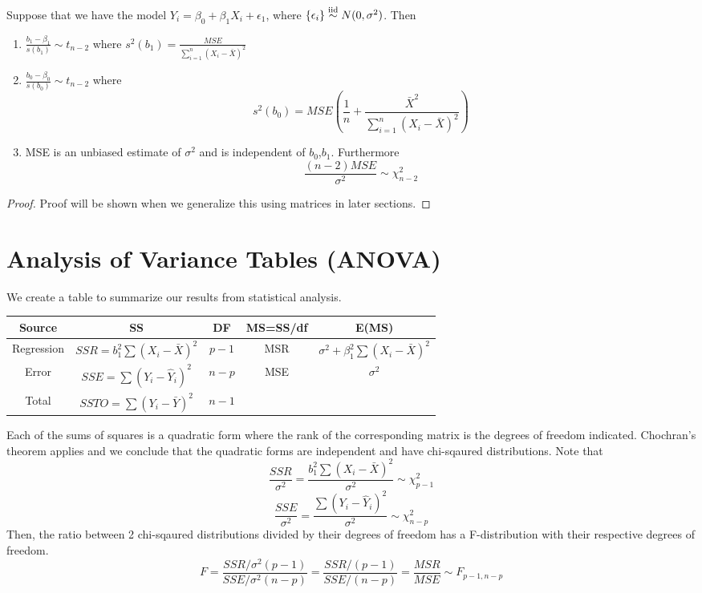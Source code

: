 Suppose that we have the model $Y_i = \beta_0 + \beta_1X_i + \epsilon_1$, where $\{\epsilon_i\} \overset{\mathrm{iid}}{\sim} N(0,\sigma^2)$. Then 
\begin{enumerate}[label=(\alph*)]
    \item $\frac{b_1 - \beta_1}{s(b_1)} \sim t_{n-2}$ where $s^2(b_1) = \frac{MSE}{\sum_{i=1}^n (X_i - \bar{X})^2}$
    \item $\frac{b_0 - \beta_0}{s(b_0)} \sim t_{n-2}$ where 
    \[s^2(b_0) = MSE\left(\frac{1}{n} + \frac{\bar{X}^2}{\sum_{i=1}^n (X_i-\bar{X})^2}\right)\]
    \item MSE is an unbiased estimate of $\sigma^2$ and is independent of $b_0$,$b_1$. Furthermore
    \[\frac{(n-2)MSE}{\sigma^2} \sim \chi_{n-2}^2\]
\end{enumerate}
\begin{proof}
    Proof will be shown when we generalize this using matrices in later sections.
\end{proof}

\section{Analysis of Variance Tables (ANOVA)}

We create a table to summarize our results from statistical analysis. 

\begin{center}
    \begin{tabular}{|c|c|c|c|c|}
        \hline
        Source & SS & DF & MS=SS/df & E(MS)\\
        \hline
        \hline
        Regression & $SSR = b_1^2\sum(X_i-\bar{X})^2$ & $p-1$ & MSR & $\sigma^2 + \beta_1^2\sum(X_i - \bar{X})^2$\\
        \hline
        Error & $SSE=\sum(Y_i - \hat{Y}_i)^2$ & $n-p$ & MSE & $\sigma^2$\\
        \hline 
        Total & $SSTO =\sum(Y_i - \bar{Y})^2$ & $n-1$ & & \\
        \hline
    \end{tabular}
\end{center}

Each of the sums of squares is a quadratic form where the rank of the corresponding matrix is the degrees of freedom indicated. Chochran's theorem applies and we conclude that the quadratic forms are independent and have chi-sqaured distributions. Note that 
\[\frac{SSR}{\sigma^2} = \frac{b_1^2\sum(X_i - \bar{X})^2}{\sigma^2} \sim \chi^2_{p-1}\]
\[\frac{SSE}{\sigma^2} = \frac{\sum (Y_i - \hat{Y}_i)^2}{\sigma^2} \sim \chi^2_{n-p}\]
Then, the ratio between 2 chi-sqaured distributions divided by their degrees of freedom has a F-distribution with their respective degrees of freedom. 
\[F = \frac{SSR/\sigma^2(p-1)}{SSE/\sigma^2(n-p)} = \frac{SSR/(p-1)}{SSE/(n-p)} = \frac{MSR}{MSE} \sim F_{p-1,n-p}\]

